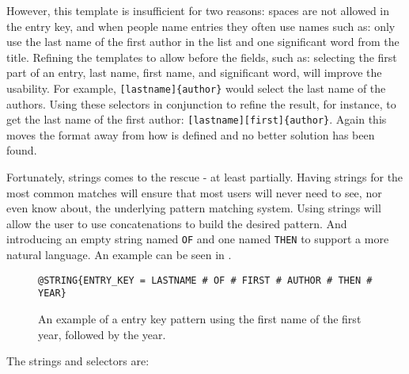 However, this template is insufficient for two reasons: spaces are not
allowed in the entry key, and when people name entries they often use
names such as: only use the last name of the first author in the list
and one significant word from the title.  Refining the templates to
allow  before the fields, such as: selecting the
first part of an entry, last name, first name, and significant word,
will improve the usability.  For example,
\texttt{[lastname]\{author\}} would select the last name of the
authors.  Using these selectors in conjunction to refine the result,
for instance, to get the last name of the first author:
\texttt{[lastname][first]\{author\}}.  Again this moves the format
away from how {\bibtex} is defined and no better solution has been
found.

Fortunately, {\bibtex} strings comes to the rescue - at least
partially.  Having strings for the most common matches will ensure
that most users will never need to see, nor even know about, the
underlying pattern matching system.  Using strings will allow the user
to use concatenations to build the desired pattern.  And introducing
an empty string named \texttt{OF} and one named \texttt{THEN} to
support a more natural language.  An example can be seen in
.

\begin{figure}
  \centering
\begin{small}
\begin{verbatim}
@STRING{ENTRY_KEY = LASTNAME # OF # FIRST # AUTHOR # THEN # YEAR}
\end{verbatim}
\end{small}
\caption{An example of a entry key pattern using the first name of
    the first year, followed by the year.}
\label{fig:analyzing_entry_key_pattern}
\end{figure}

The strings and selectors are:

